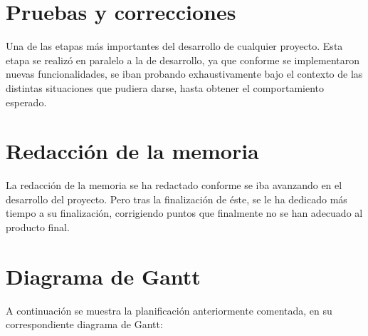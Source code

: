 \section{Pruebas y correcciones}

Una de las etapas más importantes del desarrollo de cualquier proyecto. Esta etapa se realizó en paralelo
a la de desarrollo, ya que conforme se implementaron nuevas funcionalidades, se iban probando exhaustivamente 
bajo el contexto de las distintas situaciones que pudiera darse, hasta obtener el comportamiento
esperado.

\section{Redacción de la memoria}

La redacción de la memoria se ha redactado conforme se iba avanzando en el desarrollo del proyecto.
Pero tras la finalización de éste, se le ha dedicado más tiempo a su finalización, corrigiendo puntos que
finalmente no se han adecuado al producto final.

\section{Diagrama de Gantt}

A continuación se muestra la planificación anteriormente comentada, en su correspondiente diagrama de
Gantt:
